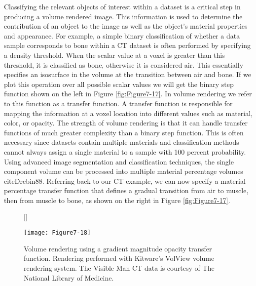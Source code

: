 Classifying the relevant objects of interest within a dataset is a critical step in producing a volume rendered image. This information is used to determine the contribution of an object to the image as well as the object's material properties and appearance. For example, a simple binary classification of whether a data sample corresponds to bone within a CT dataset is often performed by specifying a density threshold. When the scalar value at a voxel is greater than this threshold, it is classified as bone, otherwise it is considered air. This essentially specifies an isosurface in the volume at the transition between air and bone. If we plot this operation over all possible scalar values we will get the binary step function shown on the left in Figure \ref{fig:Figure7-17}. In volume rendering we refer to this function as a transfer function. A transfer function is responsible for mapping the information at a voxel location into different values such as material, color, or opacity. The strength of volume rendering is that it can handle transfer functions of much greater complexity than a binary step function. This is often necessary since datasets contain multiple materials and classification methods cannot always assign a single material to a sample with 100 percent probability. Using advanced image segmentation and classification techniques, the single component volume can be processed into multiple material percentage volumes cite{Drebin88}. Referring back to our CT example, we can now specify a material percentage transfer function that defines a gradual transition from air to muscle, then from muscle to bone, as shown on the right in Figure \ref{fig:Figure7-17}.

\begin{figure}[!htb]
	[\FBwidth]
	{\caption{Volume rendering using a gradient magnitude opacity transfer function. Rendering performed with Kitware's VolView volume rendering system. The Visible Man CT data is courtesy of The National Library of Medicine.}\label{fig:Figure7-18}}
	{\texttt{[image: Figure7-18]}}
\end{figure}

